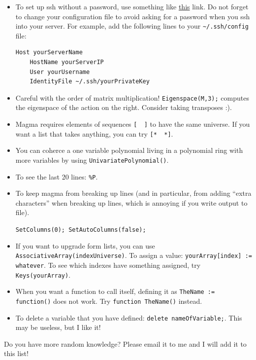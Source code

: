 \documentclass[12pt]{article}
\begin{document}
\begin{itemize}
\item To set up ssh without a password, use something like \href{https://www.strongdm.com/blog/ssh-passwordless-login}{this} link. Do not forget to change your configuration file to avoid asking for a password when you ssh into your server. For example, add the following lines to your \verb|~/.ssh/config| file:
\begin{verbatim}
Host yourServerName
    HostName yourServerIP
    User yourUsername
    IdentityFile ~/.ssh/yourPrivateKey
\end{verbatim}

\item Careful with the order of matrix multiplication! \verb|Eigenspace(M,3);|  computes the eigenspace of the action on the right. Consider taking transposes :).

\item Magma requires elements of sequences \verb|[  ]| to have the same universe.  If you want a list that takes anything, you can try \verb|[*  *]|.

\item You can coherce a one variable polynomial living in a polynomial ring with more variables by using \verb|UnivariatePolynomial()|.
\item To see the last 20 lines: \verb|%P|.

\item To keep magma from breaking up lines (and in particular, from adding ``extra characters'' when breaking up lines, which is annoying if you write output to file).  

\verb|SetColumns(0); SetAutoColumns(false);|

\item If you want to upgrade form lists, you can use \verb|AssociativeArray(indexUniverse)|.  To assign a value: \verb|yourArray[index] := whatever|.  To see which indexes have something assigned, try \verb|Keys(yourArray)|.

\item When you want a function to call itself, defining it as \verb|TheName := function()| does not work.  Try \verb|function TheName()| instead.
\item To delete a variable that you have defined: \verb|delete nameOfVariable;|.  This may be useless, but I like it! 

\end{itemize}
Do you have more random knowledge? Please email it to me and I will add it to this list!
\end{document}

